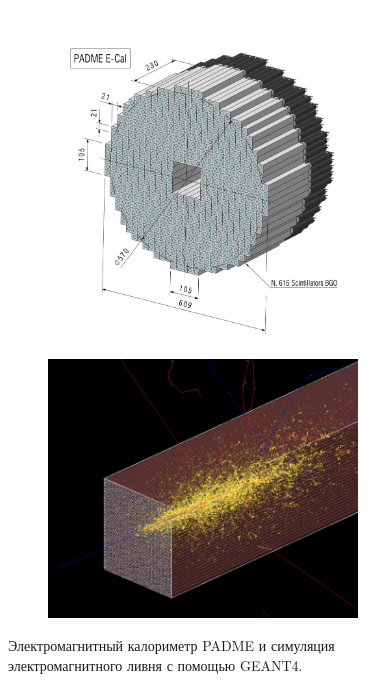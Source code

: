 \documentclass[a4paper,12pt]{extarticle}
\begin{document}
\begin{figure}
    \centering
    \begin{subfigure}{0.5\textwidth}
        \centering
        \includegraphics[width=0.9\textwidth]{graphics/ecal_big.jpg}
    \end{subfigure}%
    \begin{subfigure}{0.5\textwidth}
        \centering
        \includegraphics[width=0.9\textwidth]{graphics/shower.png}
    \end{subfigure}
    \caption[placeholder]{Электромагнитный калориметр PADME и симуляция электромагнитного ливня с помощью GEANT4\footnotemark.}
    \label{image:ecal}
\end{figure}
\end{document}
